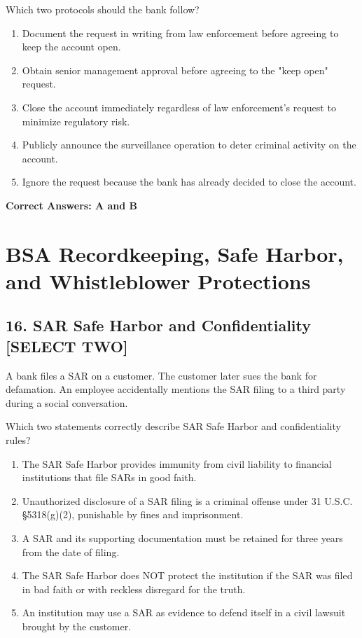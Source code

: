 \documentclass[11pt,a4paper]{article}
\begin{document}
	Which two protocols should the bank follow?
	
	\begin{enumerate}[label=\Alph*.]
		\item Document the request in writing from law enforcement before agreeing to keep the account open.
		\item Obtain senior management approval before agreeing to the "keep open" request.
		\item Close the account immediately regardless of law enforcement's request to minimize regulatory risk.
		\item Publicly announce the surveillance operation to deter criminal activity on the account.
		\item Ignore the request because the bank has already decided to close the account.
	\end{enumerate}
	
	\textbf{Correct Answers: A and B}
	
	\section{BSA Recordkeeping, Safe Harbor, and Whistleblower Protections}
	
	\subsection{16. SAR Safe Harbor and Confidentiality \textnormal{[SELECT TWO]}}
	
	A bank files a SAR on a customer. The customer later sues the bank for defamation. An employee accidentally mentions the SAR filing to a third party during a social conversation.
	
	Which two statements correctly describe SAR Safe Harbor and confidentiality rules?
	
	\begin{enumerate}[label=\Alph*.]
		\item The SAR Safe Harbor provides immunity from civil liability to financial institutions that file SARs in good faith.
		\item Unauthorized disclosure of a SAR filing is a criminal offense under 31 U.S.C. \S 5318(g)(2), punishable by fines and imprisonment.
		\item A SAR and its supporting documentation must be retained for three years from the date of filing.
		\item The SAR Safe Harbor does NOT protect the institution if the SAR was filed in bad faith or with reckless disregard for the truth.
		\item An institution may use a SAR as evidence to defend itself in a civil lawsuit brought by the customer.
	\end{enumerate}
	
\end{document}

